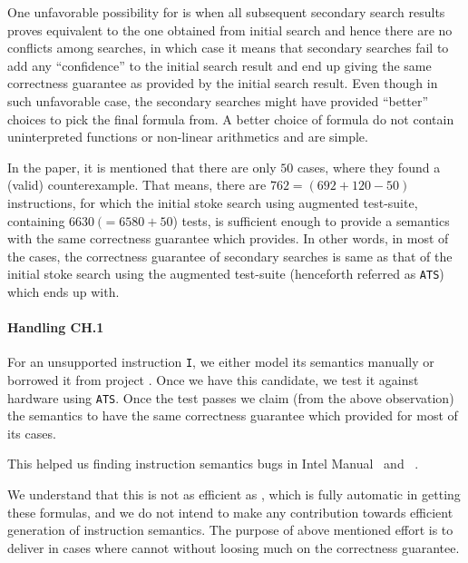       One unfavorable possibility for \Strata is when all subsequent secondary
      search results proves  equivalent to the one obtained from initial search
      and hence there are no conflicts among searches, in which case it  means
      that  secondary searches fail to add any ``confidence'' to the initial
      search result and end up giving the same correctness guarantee as provided
      by the initial search result. Even though in such unfavorable case, the
      secondary searches might have provided ``better'' choices to pick the
      final formula from. A better choice of formula do not contain
      uninterpreted functions or  non-linear arithmetics and are simple.  
    
   In the paper\cite{Heule2016a}, it is mentioned that there are only $50$
   cases, where they found a (valid) counterexample. That means, there are $762
   = (692 + 120 - 50)$ instructions, for which  the initial stoke search using
   augmented test-suite, containing $6630\ (= 6580 + 50$) tests,  is sufficient
   enough to provide a semantics with the same correctness guarantee which
   \Strata provides.   In other words, in  most of the cases, the correctness
   guarantee of secondary searches is same as that of the initial stoke search
   using the augmented test-suite (henceforth referred as {\tt ATS})  which
   \Strata ends up with. 
      
      
    \paragraph{Handling CH.1} For an unsupported instruction {\tt I}, we either
    model its semantics  manually or borrowed it from project \Stoke.   Once we
    have this candidate, we test it against hardware using {\tt ATS}.  Once the
    test passes we claim (from the above observation) the semantics to have the
    same correctness guarantee which \Strata provided for most of its cases.
    
    This helped us finding instruction semantics bugs in Intel
    Manual~\cite{BugIntel} and \Stoke~\cite{BugStoke983}.
    
    We understand that this is not as efficient as \Stoke, which is fully
    automatic in getting these formulas, and we do not intend to make any
    contribution towards efficient generation of instruction semantics. The
    purpose of above mentioned effort is to deliver in cases where \Stoke cannot
    without loosing much on the correctness guarantee. 
   
